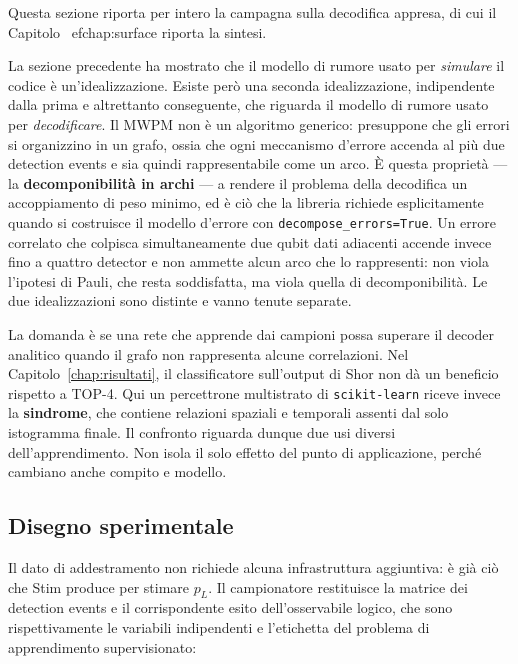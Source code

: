 

Questa sezione riporta per intero la campagna sulla decodifica appresa, di cui il
Capitolo~
ef{chap:surface} riporta la sintesi.

La sezione precedente ha mostrato che il modello di rumore usato per \emph{simulare} il codice è un'idealizzazione. Esiste però una seconda idealizzazione, indipendente dalla prima e altrettanto conseguente, che riguarda il modello di rumore usato per \emph{decodificare}. Il \ac{MWPM} non è un algoritmo generico: presuppone che gli errori si organizzino in un grafo, ossia che ogni meccanismo d'errore accenda al più due detection events e sia quindi rappresentabile come un arco. È questa proprietà --- la \textbf{decomponibilità in archi} --- a rendere il problema della decodifica un accoppiamento di peso minimo, ed è ciò che la libreria richiede esplicitamente quando si costruisce il modello d'errore con \texttt{decompose\_errors=True}. Un errore correlato che colpisca simultaneamente due qubit dati adiacenti accende invece fino a quattro detector e non ammette alcun arco che lo rappresenti: non viola l'ipotesi di Pauli, che resta soddisfatta, ma viola quella di decomponibilità. Le due idealizzazioni sono distinte e vanno tenute separate.

La domanda è se una rete che apprende dai campioni possa superare il decoder analitico quando il grafo non rappresenta alcune correlazioni. Nel Capitolo~\ref{chap:risultati}, il classificatore sull'output di Shor non dà un beneficio rispetto a TOP-4. Qui un percettrone multistrato di \texttt{scikit-learn} riceve invece la \textbf{sindrome}, che contiene relazioni spaziali e temporali assenti dal solo istogramma finale. Il confronto riguarda dunque due usi diversi dell'apprendimento. Non isola il solo effetto del punto di applicazione, perché cambiano anche compito e modello.

\subsection{Disegno sperimentale}
\label{subsec:neural_disegno}

Il dato di addestramento non richiede alcuna infrastruttura aggiuntiva: è già ciò che Stim produce per stimare $p_L$. Il campionatore restituisce la matrice dei detection events e il corrispondente esito dell'osservabile logico, che sono rispettivamente le variabili indipendenti e l'etichetta del problema di apprendimento supervisionato:


